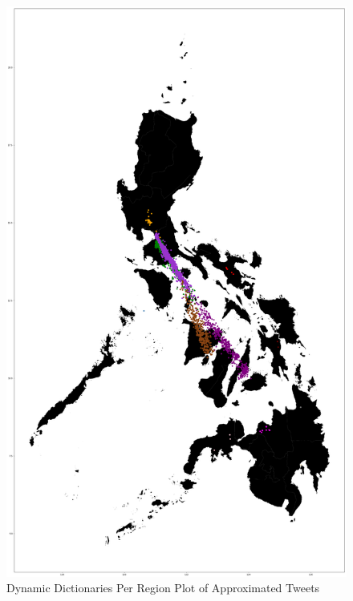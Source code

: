 \begin{figure}
    \centering
    \includegraphics[width=\textwidth, height=\textheight,keepaspectratio]{Method2ApproxMap.png}
    \caption{Dynamic Dictionaries Per Region Plot of Approximated Tweets}
    \label{fig:my_label8}
\end{figure}

